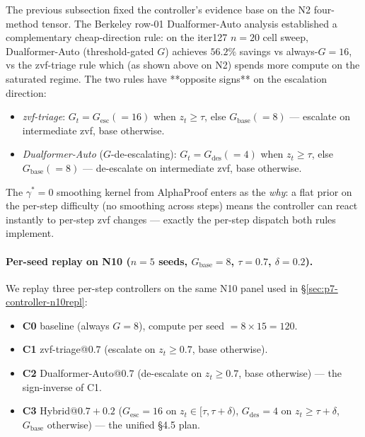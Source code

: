 \documentclass{article}
\begin{document}
The previous subsection fixed the controller's evidence base on the N2
four-method tensor. The Berkeley row-01 Dualformer-Auto analysis
\citep{su2024dualformer} established a complementary cheap-direction rule:
on the iter127 $n{=}20$ cell sweep, Dualformer-Auto (threshold-gated
$G$) achieves $56.2\%$ savings vs always-$G{=}16$, vs the
zvf-triage rule which (as shown above on N2) spends more compute on
the saturated regime. The two rules have **opposite signs** on the
escalation direction:
\begin{itemize}
\item \emph{zvf-triage}: $G_t = G_{\mathrm{esc}} (=16)$ when $z_t \geq \tau$, else $G_{\mathrm{base}} (=8)$ --- escalate on intermediate zvf, base otherwise.
\item \emph{Dualformer-Auto} ($G$-de-escalating): $G_t = G_{\mathrm{des}} (=4)$ when $z_t \geq \tau$, else $G_{\mathrm{base}} (=8)$ --- de-escalate on intermediate zvf, base otherwise.
\end{itemize}
The $\gamma^{*}{=}0$ smoothing kernel from AlphaProof \citep{alphaproof2025nature}
enters as the \emph{why}: a flat prior on the per-step difficulty (no smoothing
across steps) means the controller can react instantly to per-step zvf changes
--- exactly the per-step dispatch both rules implement.

\paragraph{Per-seed replay on N10 ($n{=}5$ seeds, $G_{\mathrm{base}}{=}8$, $\tau{=}0.7$, $\delta{=}0.2$).}
We replay three per-step controllers on the same N10 panel used in
\S\ref{sec:p7-controller-n10repl}:
\begin{itemize}
\item \textbf{C0} baseline (always $G{=}8$), compute per seed $= 8 \times 15 = 120$.
\item \textbf{C1} zvf-triage@$0.7$ (escalate on $z_t \geq 0.7$, base otherwise).
\item \textbf{C2} Dualformer-Auto@$0.7$ (de-escalate on $z_t \geq 0.7$, base otherwise) --- the sign-inverse of C1.
\item \textbf{C3} Hybrid@$0.7{+}0.2$ ($G_{\mathrm{esc}}{=}16$ on $z_t \in [\tau, \tau{+}\delta)$, $G_{\mathrm{des}}{=}4$ on $z_t \geq \tau{+}\delta$, $G_{\mathrm{base}}$ otherwise) --- the unified §4.5 plan.
\end{itemize}
\end{document}
